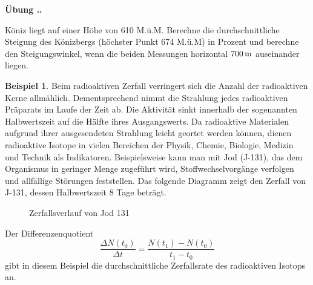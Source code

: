 \documentclass[%
11pt,%
twoside,%
titlepage,%
german,%
headsepline%
]{scrartcl}
\newcommand{\faEyeLightGray}{\textcolor{lightgray}{\faEye}} %
\newcommand{\definition}[1]{\colorbox{emerald}{#1}}
\theoremstyle{definition}
\newtheorem{bsp}{Beispiel}[subsection] %
\theoremstyle{plain}
\newcommand{\concatueb}[1]{ueb:#1}%
\newcommand{\concatlsg}[1]{lsg:#1}%
\newcounter{uebcounter}[section]
\renewcommand{\theuebcounter}{\thesection.\arabic{uebcounter}}  %
\newenvironment{uebenv}[1]{%
    \refstepcounter{uebcounter}
    \par\noindent\textbf{Übung \theuebcounter.}%
    \label{\concatueb{#1}}\hfill\hyperref[\concatlsg{#1}]{\faEyeLightGray}\par
}{%
    \par
}
\begin{document}
\begin{uebenv}{koenizberg}
Köniz liegt auf einer Höhe von 610 M.ü.M. Berechne die durchschnittliche Steigung des Könizbergs (höch\-ster Punkt 674 M.ü.M) in Prozent und berechne den Steigungswinkel, wenn die beiden Messungen horizontal $\unit[700]{m}$ auseinander liegen.
\end{uebenv}

\begin{bsp}\label{bspradioaktiv}
Beim radioaktiven Zerfall verringert sich die Anzahl der radioaktiven Kerne allmählich. Dementsprechend nimmt die Strahlung jedes radioaktiven Präparats im Laufe der Zeit ab. Die Aktivität sinkt innerhalb der sogenannten \definition{Halbwertszeit} auf die Hälfte ihres Ausgangswerts. Da radioaktive Materialen aufgrund ihrer ausgesendeten Strahlung leicht geortet werden können, dienen radioaktive Isotope in vielen Bereichen der Physik, Chemie, Biologie, Medizin und Technik als Indikatoren. Beispielsweise kann man mit Jod (J-131), das dem Organismus in geringer Menge zugeführt wird, Stoffwechselvorgänge verfolgen und allfällige Störungen feststellen. Das folgende Diagramm zeigt den Zerfall von J-131, dessen Halbwertszeit 8 Tage beträgt.

\begin{figure}
\begin{center}
\caption{Zerfallsverlauf von Jod 131}\label{jod}
\end{center}
\end{figure}

Der Differenzenquotient
$$\frac{\Delta N(t_0)}{\Delta t}=\frac{N(t_1)-N(t_0)}{t_1-t_0}$$
gibt in diesem Beispiel die durchschnittliche Zerfallsrate des radioaktiven Isotops an.
\end{bsp}
\end{document}
